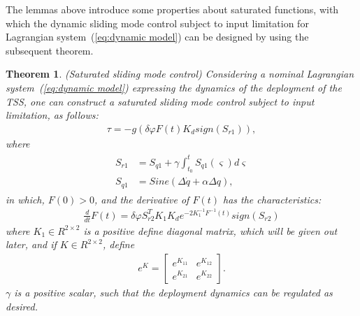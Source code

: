 \documentclass[Journal,letterpaper]{ascelike-new}
\theoremstyle{plain}
\newtheorem{mythm}{Theorem}
\theoremstyle{remark}
\begin{document}
The lemmas above introduce some properties about saturated functions, with which the dynamic sliding mode control subject to input limitation for Lagrangian system~(\ref{eq:dynamic model}) can be designed by using the subsequent theorem.
\begin{mythm}\label{thm:1}(Saturated sliding mode control)
Considering a nominal Lagrangian system~(\ref{eq:dynamic model}) expressing the dynamics of the deployment of the TSS, one can construct a saturated sliding mode control subject to input limitation, as follows:
\begin{align}
\tau = -g(\delta\varphi F(t) K_dsign(S_{r1})),\label{eq:slider control}
\end{align}
where
\begin{align}
\begin{split}
S_{r1} &= S_{q1}+\gamma\int^t_{t_0}S_{q1}(\varsigma) d\varsigma\\
S_{q1} &= Sine(\Delta \dot q+\alpha\Delta q),
\end{split}
\end{align}
in which, $F(0)>0$, and the derivative of $F(t)$ has the characteristics:
\begin{align}
\frac{d}{dt}F(t) = \delta\varphi S_{r2}^T K_1K_de^{-2K_1^{-1}F^{-1}(t)}sign(S_{r2})
\end{align}
where $K_1\in R^{2\times 2}$ is a positive define diagonal matrix, which will be given out later, and if $K\in R^{2\times 2}$, define
\begin{align}
e^K=
\begin{bmatrix}
e^{K_{11}}&e^{K_{12}}\\
e^{K_{21}}&e^{K_{22}}
\end{bmatrix}.
\end{align}
$\gamma$ is a positive scalar, such that the deployment dynamics can be regulated as desired.
\end{mythm}
\end{document}
